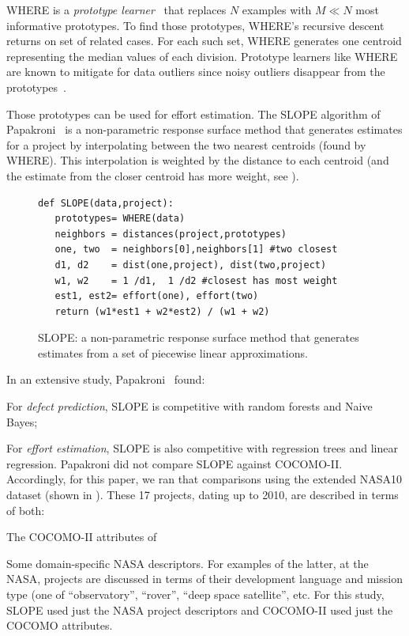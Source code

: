 WHERE is a {\em prototype learner}~\cite{chang74}
 that replaces $N$ examples with $M \ll N$ most informative prototypes.
To find those prototypes, 
WHERE's recursive descent returns on set of related cases.
For each such set, WHERE generates one centroid representing the median values
of each division. 
Prototype learners like WHERE  are known to mitigate for data outliers since 
noisy outliers disappear from the prototypes~\cite{chang74}.


Those prototypes can be used for effort estimation. 
The SLOPE algorithm of Papakroni~\cite{papa13} is
a non-parametric response surface method that generates estimates for a project by
 interpolating between
the two nearest centroids (found by WHERE).  This interpolation is weighted by the
distance to each centroid (and the estimate from
the closer centroid has more weight, see ).
\begin{figure}[!t]
\begin{lstlisting}
def SLOPE(data,project):
   prototypes= WHERE(data)
   neighbors = distances(project,prototypes) 
   one, two  = neighbors[0],neighbors[1] #two closest
   d1, d2    = dist(one,project), dist(two,project)
   w1, w2    = 1 /d1,  1 /d2 #closest has most weight
   est1, est2= effort(one), effort(two)
   return (w1*est1 + w2*est2) / (w1 + w2) 
\end{lstlisting}
\caption{SLOPE: a non-parametric response surface method that 
generates estimates from a  set of piecewise linear approximations.}\label{fig:slope}
\end{figure}
In an extensive study,
Papakroni~\cite{papa13} found:
\bi
\item For {\em defect prediction}, SLOPE is competitive
with random forests and  Naive Bayes;
\item For {\em effort estimation}, SLOPE is also competitive with
regression trees and linear regression.
\ei
Papakroni did not compare SLOPE against COCOMO-II.
Accordingly, for this paper, we ran that comparisons
using the extended NASA10  dataset (shown in ).
These  17 projects,  dating up to 2010, are described in terms of both:
\bi
\item
The COCOMO-II attributes of
\item
Some domain-specific NASA descriptors.
\ei
For examples of the latter,  at the NASA,  projects are discussed in terms of their development language
and mission type (one of ``observatory'', ``rover'', ``deep space satellite'', etc.
For this study, SLOPE used just the NASA project descriptors and
COCOMO-II used just the COCOMO attributes. 

